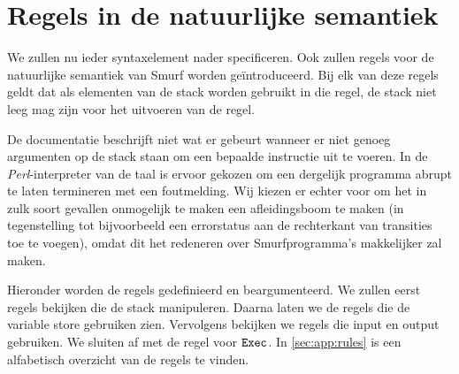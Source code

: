 \section{Regels in de natuurlijke semantiek}
\label{sec:rules}

We zullen nu ieder syntaxelement nader specificeren. Ook zullen regels voor de
natuurlijke semantiek van Smurf worden geïntroduceerd. Bij elk van deze regels
geldt dat als elementen van de stack worden gebruikt in die regel, de stack
niet leeg mag zijn voor het uitvoeren van de regel. %

De documentatie \cite{safalra} beschrijft niet wat er gebeurt wanneer er niet
genoeg argumenten op de stack staan om een bepaalde instructie uit te voeren.
In de \emph{Perl}-interpreter van de taal is ervoor gekozen om een dergelijk
programma abrupt te laten termineren met een foutmelding.  Wij kiezen er echter
voor om het in zulk soort gevallen onmogelijk te maken een afleidingsboom te
maken (in tegenstelling tot bijvoorbeeld een errorstatus aan de rechterkant van
transities toe te voegen), omdat dit het redeneren over Smurfprogramma's
makkelijker zal maken.

Hieronder worden de regels gedefinieerd en beargumenteerd. We zullen eerst
regels bekijken die de stack manipuleren. Daarna laten we de regels die de
variable store gebruiken zien. Vervolgens bekijken we regels die input en
output gebruiken. We sluiten af met de regel voor $\texttt{Exec}$. In
\autoref{sec:app:rules} is een alfabetisch overzicht van de regels te vinden.












